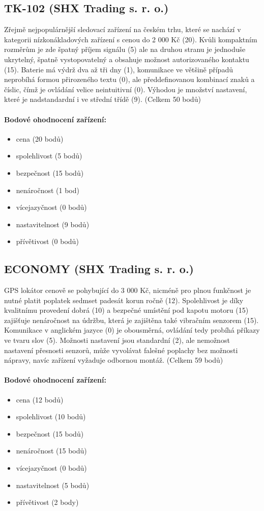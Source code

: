 \documentclass[FM,BP]{tulthesis}  %
\begin{document}
\subsection{TK-102 (SHX Trading s. r. o.)}
Zřejmě nejpopulárnější sledovací zařízení na českém trhu, které se nachází v kategorii nízkonákladových zařízení s cenou do 2 000 Kč (20). Kvůli kompaktním rozměrům je zde špatný příjem signálu (5) ale na druhou stranu je jednoduše ukrytelný, špatně vystopovatelný a obsahuje možnost autorizovaného kontaktu (15). Baterie má výdrž dva až tři dny (1), komunikace ve většině případů neprobíhá formou přirozeného textu (0), ale předdefinovanou kombinací znaků a číslic, čímž je ovládání velice neintuitivní (0). Výhodou je množství nastavení, které je nadstandardní i ve střední třídě (9). (Celkem 50 bodů)

\paragraph{Bodové ohodnocení zařízení:}
\begin{itemize}
\item cena (20 bodů)
\item spolehlivost (5 bodů)
\item bezpečnost (15 bodů)
\item nenáročnost (1 bod)
\item vícejazyčnost (0 bodů)
\item nastavitelnost (9 bodů)
\item přívětivost (0 bodů)
\end{itemize}

\subsection{ECONOMY (SHX Trading s. r. o.)}
GPS lokátor cenově se pohybující do 3 000 Kč, nicméně pro plnou funkčnost je nutné platit poplatek sedmset padesát korun ročně (12). Spolehlivost je díky kvalitnímu provedení dobrá (10) a bezpečné umístění pod kapotu motoru (15) zajišťuje nenáročnost na údržbu, která je zajištěna také vibračním senzorem (15). Komunikace v anglickém jazyce (0) je obousměrná, ovládání tedy probíhá příkazy ve tvaru slov (5). Možnosti nastavení jsou standardní (2), ale nemožnost nastavení přesnosti senzorů, může vyvolávat falešné poplachy bez možnosti nápravy, navíc zařízení vyžaduje odbornou montáž. (Celkem 59 bodů)

\paragraph{Bodové ohodnocení zařízení:}
\begin{itemize}
\item cena (12 bodů)
\item spolehlivost (10 bodů)
\item bezpečnost (15 bodů)
\item nenáročnost (15 bodů)
\item vícejazyčnost (0 bodů)
\item nastavitelnost (5 bodů)
\item přívětivost (2 body)
\end{itemize}
\end{document}
